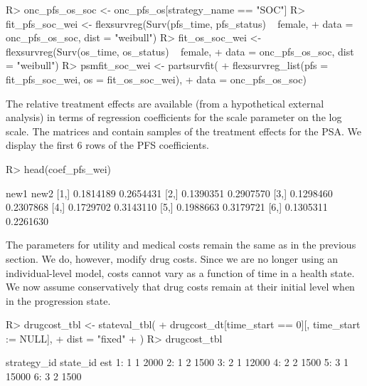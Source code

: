 \documentclass[article, nojss]{jss}\usepackage[]{graphicx}\usepackage[]{color}
\begin{document}
\begin{Schunk}
\begin{Sinput}
R> onc_pfs_os_soc <- onc_pfs_os[strategy_name == "SOC"]
R> fit_pfs_soc_wei <- flexsurvreg(Surv(pfs_time, pfs_status) ~ female,
+    data = onc_pfs_os_soc, dist = "weibull")
R> fit_os_soc_wei <- flexsurvreg(Surv(os_time, os_status) ~  female,
+    data = onc_pfs_os_soc, dist = "weibull")
R> psmfit_soc_wei <- partsurvfit(
+    flexsurvreg_list(pfs = fit_pfs_soc_wei, os = fit_os_soc_wei), 
+    data = onc_pfs_os_soc)
\end{Sinput}
\end{Schunk}

The relative treatment effects are available (from a hypothetical external analysis) in terms of regression coefficients for the scale parameter on the log scale. The matrices  and  contain samples of the treatment effects for the PSA. We display the first 6 rows of the PFS coefficients. 



\begin{Schunk}
\begin{Sinput}
R> head(coef_pfs_wei)
\end{Sinput}
\begin{Soutput}
          new1      new2
[1,] 0.1814189 0.2654431
[2,] 0.1390351 0.2907570
[3,] 0.1298460 0.2307868
[4,] 0.1729702 0.3143110
[5,] 0.1988663 0.3179721
[6,] 0.1305311 0.2261630
\end{Soutput}
\end{Schunk}

The parameters for utility and medical costs remain the same as in the previous section. We do, however, modify drug costs. Since we are no longer using an individual-level model, costs cannot vary as a function of time in a health state. We now assume conservatively that drug costs remain at their initial level when in the progression state.  

\begin{Schunk}
\begin{Sinput}
R> drugcost_tbl <- stateval_tbl(
+    drugcost_dt[time_start ==  0][, time_start := NULL],
+    dist = "fixed"
+  )
R> drugcost_tbl
\end{Sinput}
\begin{Soutput}
   strategy_id state_id   est
1:           1        1  2000
2:           1        2  1500
3:           2        1 12000
4:           2        2  1500
5:           3        1 15000
6:           3        2  1500
\end{Soutput}
\end{Schunk}
\end{document}
